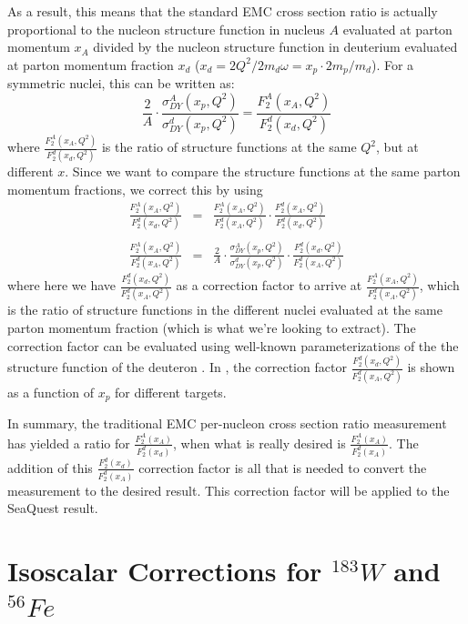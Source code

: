 As a result, this means that the standard EMC cross section ratio is actually proportional to the nucleon structure function in nucleus $A$ evaluated at parton momentum $x_A$ divided by the nucleon structure function in deuterium evaluated at parton momentum fraction $x_d$ ($x_d = 2Q^2/2m_d\omega = x_p \cdot 2m_p/m_d$)\cite{Hen:2013oha}. For a symmetric nuclei, this can be written as:
\begin{equation}
\frac{2}{A} \cdot \frac{\sigma^A_{DY}(x_p, Q^2)}{\sigma^d_{DY}(x_p, Q^2)} = \frac{F_2^A(x_A, Q^2)}{F_2^d(x_d, Q^2)}
\end{equation}
where $\frac{F_2^A(x_A, Q^2)}{F_2^d(x_d, Q^2)}$ is the ratio of structure functions at the same $Q^2$, but at different $x$. Since we want to compare the structure functions at the same parton momentum fractions, we correct this by using
\begin{eqnarray}
\frac{F_2^A(x_A, Q^2)}{F_2^d(x_d, Q^2)} & = & \frac{F_2^A(x_A, Q^2)}{F_2^d(x_A, Q^2)} \cdot \frac{F_2^d(x_A, Q^2)}{F_2^d(x_d, Q^2)} \\
& & \nonumber \\
\frac{F_2^A(x_A, Q^2)}{F_2^d(x_A, Q^2)} & = & \frac{2}{A} \cdot \frac{\sigma^A_{DY}(x_p, Q^2)}{\sigma^d_{DY}(x_p, Q^2)} \cdot \frac{F_2^d(x_d, Q^2)}{F_2^d(x_A, Q^2)}
\label{eq:struc-func-ratio-xA}
\end{eqnarray}
where here we have $\frac{F_2^d(x_d, Q^2)}{F_2^d(x_A, Q^2)}$ as a correction factor to arrive at $\frac{F_2^A(x_A, Q^2)}{F_2^d(x_A, Q^2)}$, which is the ratio of structure functions in the different nuclei evaluated at the same parton momentum fraction (which is what we're looking to extract). The correction factor can be evaluated using well-known parameterizations of the the structure function of the deuteron . In , the correction factor $\frac{F_2^d(x_d, Q^2)}{F_2^d(x_A, Q^2)}$ is shown as a function of $x_p$ for different targets.

In summary, the traditional EMC per-nucleon cross section ratio measurement has yielded a ratio for $\frac{F_2^A(x_A)}{F_2^d(x_d)}$, when what is really desired is $\frac{F_2^A(x_A)}{F_2^d(x_A)}$. The addition of this $\frac{F_2^d(x_d)}{F_2^d(x_A)}$ correction factor is all that is needed to convert the measurement to the desired result. This correction factor will be applied to the SeaQuest result.

\section{\texorpdfstring{Isoscalar Corrections for $^{183}W$ and $^{56}Fe$}{Isoscalar Corrections for W-183 and Fe-56 }}

